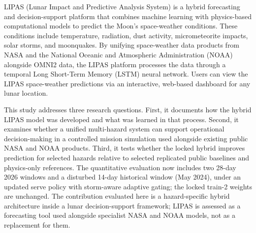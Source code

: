 LIPAS (Lunar Impact and Predictive Analysis System) is a hybrid forecasting and decision-support platform that combines machine learning with physics-based computational models to predict the Moon's space-weather conditions. These conditions include temperature, radiation, dust activity, micrometeorite impacts, solar storms, and moonquakes. By unifying space-weather data products from NASA and the National Oceanic and Atmospheric Administration (NOAA) alongside OMNI2 data, the LIPAS platform processes the data through a temporal Long Short-Term Memory (LSTM) neural network. Users can view the LIPAS space-weather predictions via an interactive, web-based dashboard for any lunar location.

This study addresses three research questions. First, it documents how the hybrid LIPAS model was developed and what was learned in that process. Second, it examines whether a unified multi-hazard system can support operational decision-making in a controlled mission simulation used alongside existing public NASA and NOAA products. Third, it tests whether the locked hybrid improves prediction for selected hazards relative to selected replicated public baselines and physics-only references. The quantitative evaluation now includes two 28-day 2026 windows and a disturbed 14-day historical window (May 2024), under an updated serve policy with storm-aware adaptive gating; the locked train-2 weights are unchanged. The contribution evaluated here is a hazard-specific hybrid architecture inside a lunar decision-support framework; LIPAS is assessed as a forecasting tool used alongside specialist NASA and NOAA models, not as a replacement for them.
